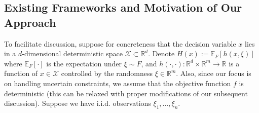 \documentclass[mnsc,blindrev]{informs4} %
\newcommand{\R}{\mathbb{R}}
\begin{document}



\subsection{Existing Frameworks and Motivation of Our Approach}\label{sec:existing}

To facilitate discussion, suppose for concreteness that the decision variable $x$ lies in a $d$-dimensional deterministic space $\mathcal X\subset\mathbb R^d$. Denote $H(x):=\mathbb E_{F}[h(x,\xi)]$ where $\mathbb E_F[\cdot]$ is the expectation under  $\xi\sim F$, and $h(\cdot,\cdot):\R^d\times \R^m\to\R$ is a function of $x\in\mathcal X$ controlled by the randomness $\xi\in\mathbb R^m$. Also, since our focus is on handling uncertain constraints, we assume that the objective function $f$ is deterministic (this can be relaxed with proper modifications of our subsequent discussion). Suppose we have i.i.d. observations $\xi_1,\ldots,\xi_n$.
\end{document}
